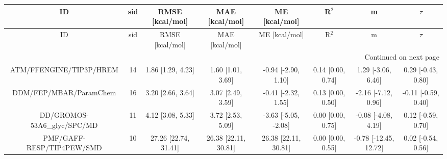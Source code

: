 \documentclass[8pt]{article}
\begin{document}
\begin{center}
\begin{footnotesize}
\begin{longtable}{|cccccccc|}
\toprule
                         ID & sid &      RMSE [kcal/mol] &       MAE [kcal/mol] &        ME [kcal/mol] &             R$^2$ &                     m &              $\tau$ \\
\midrule
\endfirsthead

\toprule
                         ID & sid &      RMSE [kcal/mol] &       MAE [kcal/mol] &        ME [kcal/mol] &             R$^2$ &                     m &              $\tau$ \\
\midrule
\endhead
\midrule
\multicolumn{8}{r}{{Continued on next page}} \\
\midrule
\endfoot

\bottomrule
\endlastfoot
    ATM/FFENGINE/TIP3P/HREM &  14 &    1.86 [1.29, 4.23] &    1.60 [1.01, 3.69] &  -0.94 [-2.90, 1.10] & 0.14 [0.00, 0.74] &    1.29 [-3.06, 6.46] &  0.29 [-0.43, 0.80] \\
     DDM/FEP/MBAR/ParamChem &  16 &    3.20 [2.66, 3.64] &    3.07 [2.49, 3.59] &  -0.41 [-2.32, 1.55] & 0.13 [0.00, 0.50] &   -2.16 [-7.12, 0.96] & -0.11 [-0.59, 0.40] \\
DD/GROMOS-53A6\_glyc/SPC/MD &  11 &    4.12 [3.08, 5.33] &    3.72 [2.53, 5.09] & -3.63 [-5.05, -2.08] & 0.00 [0.00, 0.75] &   -0.08 [-4.08, 4.19] &  0.12 [-0.59, 0.70] \\
  PMF/GAFF-RESP/TIP4PEW/SMD &  10 & 27.26 [22.74, 31.41] & 26.38 [22.11, 30.81] & 26.38 [22.11, 30.81] & 0.00 [0.00, 0.55] & -0.78 [-12.45, 12.72] &  0.02 [-0.54, 0.56] \\
\end{longtable}
\end{footnotesize}
\end{center}
\end{document}
